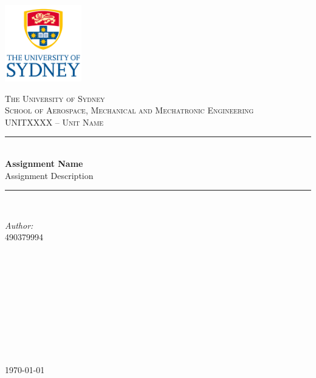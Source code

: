 \documentclass[11pt,a4,table]{article}
\begin{document}

 
\begin{titlepage}

\newcommand{\HRule}{\rule{\linewidth}{0.5mm}} 
\begin{flushright}
\includegraphics[width=0.25\textwidth]{Images/usydNew.png}\\[2cm]
\end{flushright}

\center 


\textsc{\huge The University of Sydney}\\[0.75cm]
\textsc{\Large School of Aerospace, Mechanical and Mechatronic Engineering}\\[1cm]

\textsc{\Large UNITXXXX -- Unit Name}\\[1cm] 


\HRule \\[0.4cm]
{ \huge \bfseries Assignment Name}\\[0.4cm] 
{\Large Assignment Description}\\[0.4cm]
\HRule \\[1.25cm]
 

\begin{minipage}{0.4\textwidth}
\begin{flushleft} \large
\emph{Author:}\\
\textsc{490379994}\\
\end{flushleft}
\end{minipage}
~
\begin{minipage}{0.4\textwidth}
\begin{flushright} \large\emph{}\\
\textsc{ }\\
\textsc{ }\\
\textsc{ }\\
\textsc{ }\\
\textsc{ }\\
\end{flushright}
\end{minipage}\\[1.5cm]


{\large \today}\\[1.5cm]

\vfill

\end{titlepage}
\newpage
\end{document}
